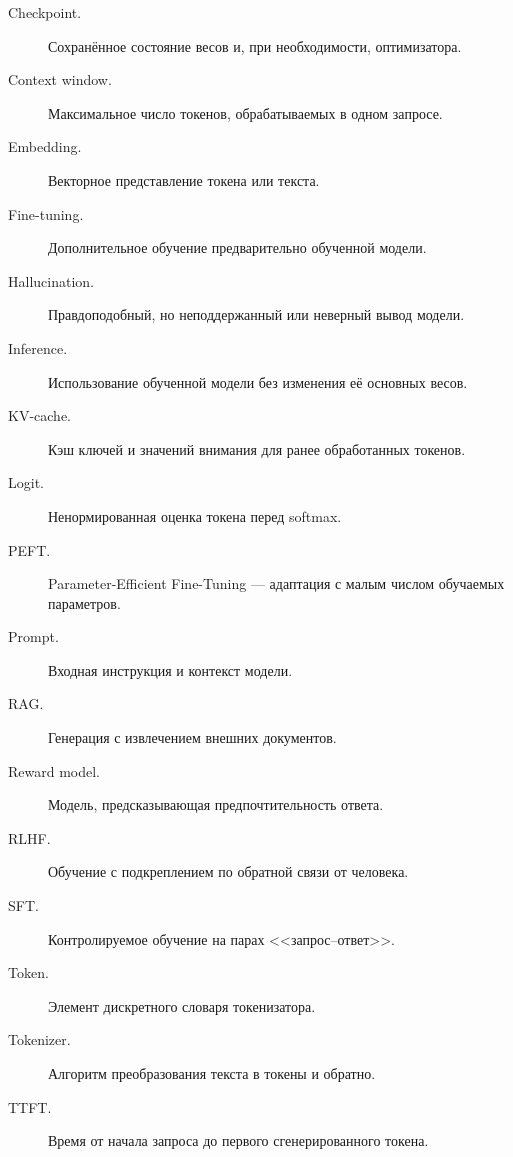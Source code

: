 \documentclass[12pt,a4paper]{article}
\newcommand{\1}{\mathbf{1}}
\theoremstyle{definition}
\theoremstyle{remark}
\begin{document}
\begin{description}
    \item[Checkpoint.] Сохранённое состояние весов и, при необходимости,
    оптимизатора.

    \item[Context window.] Максимальное число токенов, обрабатываемых в
    одном запросе.

    \item[Embedding.] Векторное представление токена или текста.

    \item[Fine-tuning.] Дополнительное обучение предварительно обученной
    модели.

    \item[Hallucination.] Правдоподобный, но неподдержанный или неверный
    вывод модели.

    \item[Inference.] Использование обученной модели без изменения её
    основных весов.

    \item[KV-cache.] Кэш ключей и значений внимания для ранее обработанных
    токенов.

    \item[Logit.] Ненормированная оценка токена перед softmax.

    \item[PEFT.] Parameter-Efficient Fine-Tuning --- адаптация с малым
    числом обучаемых параметров.

    \item[Prompt.] Входная инструкция и контекст модели.

    \item[RAG.] Генерация с извлечением внешних документов.

    \item[Reward model.] Модель, предсказывающая предпочтительность ответа.

    \item[RLHF.] Обучение с подкреплением по обратной связи от человека.

    \item[SFT.] Контролируемое обучение на парах <<запрос--ответ>>.

    \item[Token.] Элемент дискретного словаря токенизатора.

    \item[Tokenizer.] Алгоритм преобразования текста в токены и обратно.

    \item[TTFT.] Время от начала запроса до первого сгенерированного токена.
\end{description}
\end{document}
